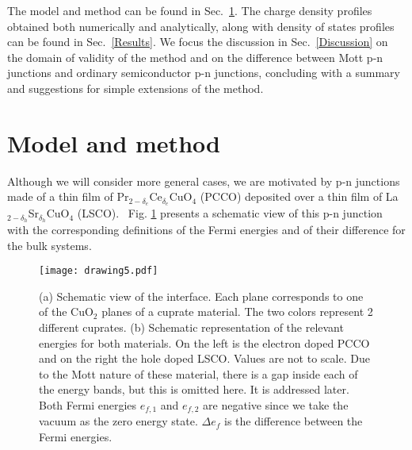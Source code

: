\documentclass[twocolumn, preprintnumbers,prb,aps,amssymb,showpacs]{revtex4}
\begin{document}
The model and method can be found in Sec.~\ref{Model}. The charge density profiles obtained both numerically and analytically, along with density of states profiles can be found in Sec.~\ref{Results}. We focus the discussion in Sec.~\ref{Discussion} on the domain of validity of the method and on the difference between Mott p-n junctions and ordinary semiconductor p-n junctions, concluding with a summary and suggestions for simple extensions of the method.

\section{Model and method}\label{Model}

Although we will consider more general cases, we are motivated by p-n junctions made of a thin film of Pr$_{2-\delta_e}$Ce$_{\delta_e}$CuO$_4$ (PCCO) deposited over a thin film of La$_{2-\delta_h}$Sr$_{\delta_h}$CuO$_4$ (LSCO).~\cite{hardy_private_2012} Fig. \ref{fig0:model} presents a schematic view of this p-n junction with the corresponding definitions of the Fermi energies and of their difference for the bulk systems.

\begin{figure}[tbp]
\begin{center}
\texttt{[image: drawing5.pdf]}
\end{center}
\caption{(a) Schematic view of the interface. Each plane corresponds to one of the CuO$_{2}$ planes of a cuprate material. The two colors represent 2 different cuprates. (b) Schematic representation of the relevant energies for both materials. On the left is the electron doped PCCO and on the right the hole doped LSCO. Values are not to scale. Due to the Mott nature of these material, there is a gap inside each of the energy bands, but this is omitted here. It is addressed later. Both Fermi energies $e_{f,1}$ and $e_{f,2}$ are negative since we take the vacuum as the zero energy state. $\Delta e_{f}$ is the difference between the Fermi energies.}
\label{fig0:model}
\end{figure}
\end{document}
